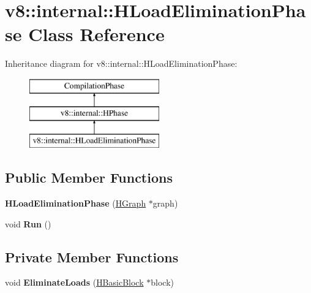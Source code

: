 \hypertarget{classv8_1_1internal_1_1_h_load_elimination_phase}{}\section{v8\+:\+:internal\+:\+:H\+Load\+Elimination\+Phase Class Reference}
\label{classv8_1_1internal_1_1_h_load_elimination_phase}
Inheritance diagram for v8\+:\+:internal\+:\+:H\+Load\+Elimination\+Phase\+:\begin{figure}[H]
\begin{center}
\leavevmode
\includegraphics[height=3.000000cm]{classv8_1_1internal_1_1_h_load_elimination_phase}
\end{center}
\end{figure}
\subsection*{Public Member Functions}
\begin{DoxyCompactItemize}
\item 
{\bfseries H\+Load\+Elimination\+Phase} (\hyperlink{classv8_1_1internal_1_1_h_graph}{H\+Graph} $\ast$graph)\hypertarget{classv8_1_1internal_1_1_h_load_elimination_phase_a8b62a7c5c626d0aa54eb59aa84eb1648}{}\label{classv8_1_1internal_1_1_h_load_elimination_phase_a8b62a7c5c626d0aa54eb59aa84eb1648}

\item 
void {\bfseries Run} ()\hypertarget{classv8_1_1internal_1_1_h_load_elimination_phase_a7502b30075f94dd27f53a399b6fc9416}{}\label{classv8_1_1internal_1_1_h_load_elimination_phase_a7502b30075f94dd27f53a399b6fc9416}

\end{DoxyCompactItemize}
\subsection*{Private Member Functions}
\begin{DoxyCompactItemize}
\item 
void {\bfseries Eliminate\+Loads} (\hyperlink{classv8_1_1internal_1_1_h_basic_block}{H\+Basic\+Block} $\ast$block)\hypertarget{classv8_1_1internal_1_1_h_load_elimination_phase_a9e4a98da1d8b9d9d4de875b965dca47a}{}\label{classv8_1_1internal_1_1_h_load_elimination_phase_a9e4a98da1d8b9d9d4de875b965dca47a}

\end{DoxyCompactItemize}
